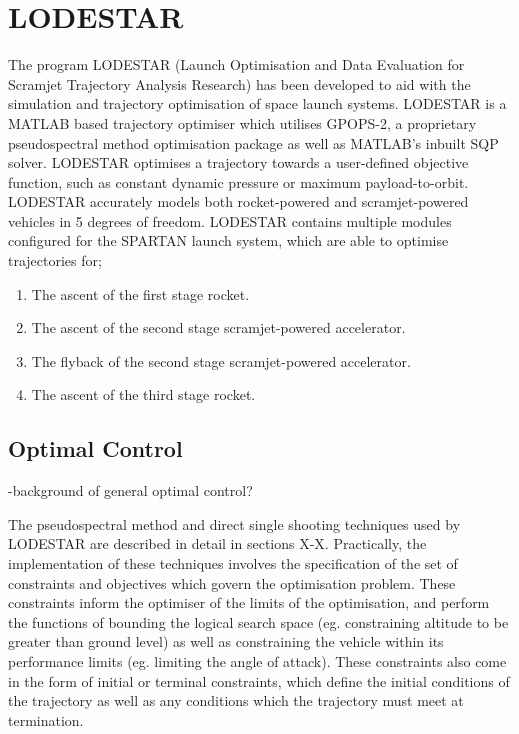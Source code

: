 
\cleardoublepage
\chapter{LODESTAR}\label{chapter:experimental-results}	

The program LODESTAR (Launch Optimisation and Data Evaluation for Scramjet Trajectory Analysis Research) has been developed to aid with the simulation and trajectory optimisation of space launch systems. LODESTAR is a MATLAB based trajectory optimiser which utilises GPOPS-2, a proprietary pseudospectral method optimisation package as well as MATLAB's inbuilt SQP solver. LODESTAR optimises a trajectory towards a user-defined objective function, such as constant dynamic pressure or maximum payload-to-orbit.  LODESTAR accurately models both rocket-powered and scramjet-powered vehicles in 5 degrees of freedom. LODESTAR contains multiple modules configured for the SPARTAN launch system, which are able to optimise trajectories for;
\begin{enumerate}
 \item The ascent of the first stage rocket.
 \item The ascent of the second stage scramjet-powered accelerator.
 \item The flyback of the second stage scramjet-powered accelerator.
 \item The ascent of the third stage rocket.
\end{enumerate}

\section{Optimal Control}
-background of general optimal control? 


The pseudospectral method and direct single shooting techniques used by LODESTAR are described in detail in sections X-X. Practically, the implementation of these techniques involves the specification of the set of constraints and objectives which govern the optimisation problem. These constraints inform the optimiser of the limits of the optimisation, and perform the functions of bounding the logical search space (eg. constraining altitude to be greater than ground level) as well as constraining the vehicle within its performance limits (eg. limiting the angle of attack). These constraints also come in the form of initial or terminal constraints, which define the initial conditions of the trajectory as well as any conditions which the trajectory must meet at termination. 

